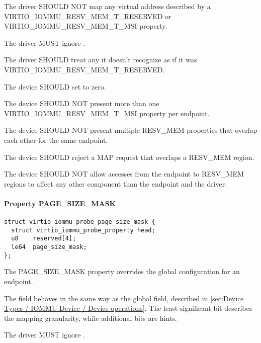 The driver SHOULD NOT map any virtual address described by a
VIRTIO_IOMMU_RESV_MEM_T_RESERVED or VIRTIO_IOMMU_RESV_MEM_T_MSI property.

The driver MUST ignore .

The driver SHOULD treat any  it doesn't recognize as if it
was VIRTIO_IOMMU_RESV_MEM_T_RESERVED.


The device SHOULD set  to zero.

The device SHOULD NOT present more than one VIRTIO_IOMMU_RESV_MEM_T_MSI
property per endpoint.

The device SHOULD NOT present multiple RESV_MEM properties that overlap
each other for the same endpoint.

The device SHOULD reject a MAP request that overlaps a RESV_MEM region.

The device SHOULD NOT allow accesses from the endpoint to RESV_MEM regions
to affect any other component than the endpoint and the driver.


\paragraph{Property PAGE_SIZE_MASK}\label{sec:Device Types / IOMMU Device / Device operations / PROBE properties / PAGE_SIZE_MASK}

\begin{lstlisting}
struct virtio_iommu_probe_page_size_mask {
  struct virtio_iommu_probe_property head;
  u8    reserved[4];
  le64  page_size_mask;
};
\end{lstlisting}

The PAGE_SIZE_MASK property overrides the global
 configuration for an endpoint.

The  field behaves in the same way as the
global  field, described in \ref{sec:Device
Types / IOMMU Device / Device operations}. The least significant
bit describes the mapping granularity, while additional bits are
hints.


The driver MUST ignore .


